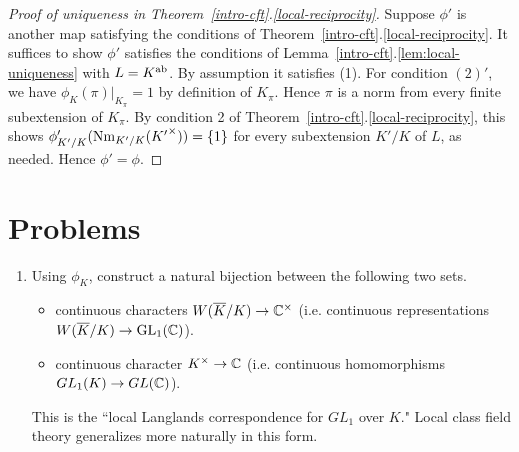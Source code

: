 \begin{proof}[Proof of uniqueness in Theorem~\ref{intro-cft}.\ref{local-reciprocity}]
Suppose $\phi'$ is another map satisfying the conditions of Theorem~\ref{intro-cft}.\ref{local-reciprocity}. It suffices to show $\phi'$ satisfies the conditions of Lemma~\ref{intro-cft}.\ref{lem:local-uniqueness} with $L=K^{\text{ab}}$. By assumption it satisfies (1). For condition $(2)'$, we have $\phi_{K}(\pi)|_{K_{\pi}}=1$ by definition of $K_{\pi}$. Hence $\pi$ is a norm from every finite subextension of $K_{\pi}$. By condition 2 of Theorem~\ref{intro-cft}.\ref{local-reciprocity}, this shows $\phi'_{K'/K}(\operatorname{Nm}_{K'/K}({K'}^{\times}))=\{1\}$ for every subextension $K'/K$ of $L$, as needed. Hence $\phi'=\phi$.
\end{proof}
\section*{Problems}
\begin{enumerate}
\item
Using $\phi_K$, construct a natural bijection between the following two sets.
\begin{itemize}
\item
continuous characters $W(\overline{K}/K)\to \mathbb{C}^{\times}$ (i.e. continuous representations $W(\overline{K}/K)\to \operatorname{GL}_1(\mathbb{C})$).
\item
continuous character $K^{\times}\to \mathbb{C}$ (i.e. continuous homomorphisms $GL_1(K)\to GL(\mathbb{C})$).
\end{itemize}
This is the ``local Langlands correspondence for $GL_1$ over $K$." Local class field theory generalizes more naturally in this form.
\end{enumerate}